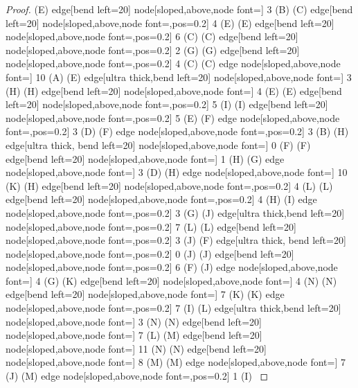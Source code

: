 \begin{proof}
{(E) edge[bend left=20]  node[sloped,above,node font=\tiny] {3} (B)
(C) edge[bend left=20]
 node[sloped,above,node font=\tiny,pos=0.2] {4} (E)
(E) edge[bend left=20]  node[sloped,above,node font=\tiny,pos=0.2] {6} (C)
(C) edge[bend left=20]
 node[sloped,above,node font=\tiny,pos=0.2] {2} (G)
(G) edge[bend left=20]  node[sloped,above,node font=\tiny,pos=0.2] {4} (C)
(C) edge node[sloped,above,node font=\tiny] {10} (A)
(E) edge[ultra thick,bend left=20]
 node[sloped,above,node font=\tiny] {3} (H)
(H) edge[bend left=20]  node[sloped,above,node font=\tiny] {4} (E)
(E) edge[bend left=20]
 node[sloped,above,node font=\tiny,pos=0.2] {5} (I)
(I) edge[bend left=20]  node[sloped,above,node font=\tiny,pos=0.2] {5} (E)
(F) edge node[sloped,above,node font=\tiny,pos=0.2] {3} (D)
(F) edge node[sloped,above,node font=\tiny,pos=0.2] {3} (B)
(H) edge[ultra thick, bend left=20]  node[sloped,above,node font=\tiny] {0} (F)
(F) edge[bend left=20]  node[sloped,above,node font=\tiny] {1} (H)
(G) edge node[sloped,above,node font=\tiny] {3} (D)
(H) edge node[sloped,above,node font=\tiny] {10} (K)
(H) edge[bend left=20]
 node[sloped,above,node font=\tiny,pos=0.2] {4} (L)
(L) edge[bend left=20]  node[sloped,above,node font=\tiny,pos=0.2] {4} (H)
(I) edge node[sloped,above,node font=\tiny,pos=0.2] {3} (G)
(J) edge[ultra thick,bend left=20]
 node[sloped,above,node font=\tiny,pos=0.2] {7} (L)
(L) edge[bend left=20]  node[sloped,above,node font=\tiny,pos=0.2] {3} (J)
(F) edge[ultra thick, bend left=20]  node[sloped,above,node font=\tiny,pos=0.2] {0} (J)
(J) edge[bend left=20]  node[sloped,above,node font=\tiny,pos=0.2] {6} (F)
(J) edge node[sloped,above,node font=\tiny] {4} (G)
(K) edge[bend left=20]
 node[sloped,above,node font=\tiny] {4} (N)
(N) edge[bend left=20]  node[sloped,above,node font=\tiny] {7} (K)
(K) edge node[sloped,above,node font=\tiny,pos=0.2] {7} (I)
(L) edge[ultra thick,bend left=20]
 node[sloped,above,node font=\tiny] {3} (N)
(N) edge[bend left=20]  node[sloped,above,node font=\tiny] {7} (L)
(M) edge[bend left=20]
 node[sloped,above,node font=\tiny] {11} (N)
(N) edge[bend left=20]  node[sloped,above,node font=\tiny] {8} (M)
(M) edge node[sloped,above,node font=\tiny] {7} (J)
(M) edge node[sloped,above,node font=\tiny,pos=0.2] {1} (I)
}
\usetikzlibrary{graphs,automata,positioning}
\end{proof}

